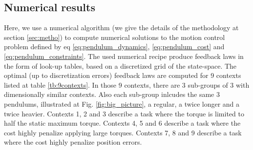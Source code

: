 \subsection{Numerical results}
Here, we use a numerical algorithm (we give the details of the methodology at section \ref{sec:metho}) to compute numerical solutions to the motion control problem defined by eq \eqref{eq:pendulum_dynamics}, \eqref{eq:pendulum_cost} and \eqref{eq:pendulum_constraints}. The used numerical recipe produce feedback laws in the form of look-up tables, based on a discretized grid of the state-space.  The optimal (up to discretization errors) feedback laws are computed for 9 contexts listed at table \ref{tb:9contexts}. In those 9 contexts, there are 3 sub-groups of 3 with dimensionally similar contexts. Also each sub-group inlcudes the same 3 pendulums, illustrated at Fig. \ref{fig:big_picture}, a regular, a twice longer and a twice heavier. Contexts 1, 2 and 3 describe a task where the torque is limited to half the static maximum torque.  Contexts 4, 5 and 6 describe a task where the cost highly penalize applying large torques. Contexts 7, 8 and 9 describe a task where the cost highly penalize position errors. 
